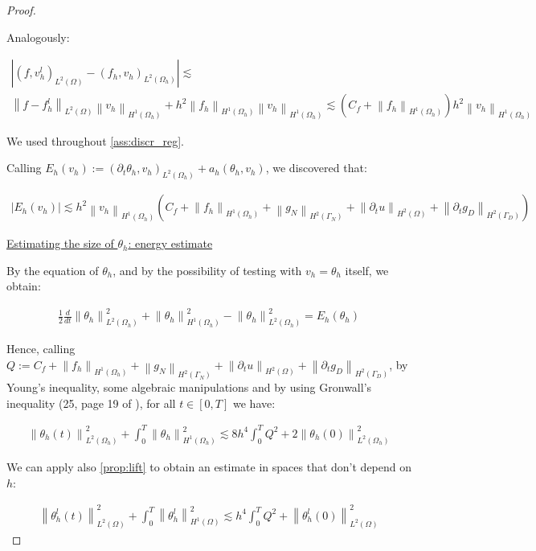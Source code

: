 \documentclass[english,a4paper,9pt,oneside]{scrbook}	%
\theoremstyle{break}
\newenvironment{mproof}[1][\proofname]{%
  \begin{proof}[#1]$ $\par\nobreak\ignorespaces
}{%
  \end{proof}
}
\renewcommand*{\proofname}{Proof}
\theoremstyle{remark}
\newcommand{\norm}[1]{\left\lVert#1\right\rVert}
\begin{document}
\begin{appendices}
\begin{mproof}
Analogously:

\begin{align*}
	|(f, v_h^l)_{L^2(\Omega)} - (f_h, v_h)_{L^2(\Omega_h)}|\lesssim\\
	\norm{f-f_h^l}_{L^2(\Omega)}\norm{v_h}_{H^1(\Omega_h)} + h^2 \norm{f_h}_{H^1(\Omega_h)}\norm{v_h}_{H^1(\Omega_h)}\lesssim (C_f + \norm{f_h}_{H^1(\Omega_h)}) h^2 \norm{v_h}_{H^1(\Omega_h)}
\end{align*}

We used throughout \cref{ass:discr_reg}.

Calling $E_h(v_h):=(\partial_t \theta_h , v_h)_{L^2(\Omega_h)} + a_h(\theta_h, v_h)$, we discovered that:

\begin{align}
\label{eqn:theta_residual}
	|E_h(v_h)|\lesssim h^2 \norm{v_h}_{H^1(\Omega_h)} (C_f + \norm{f_h}_{H^1(\Omega_h)} + \norm{g_N}_{H^2(\Gamma_N)} + \norm{\partial_t u}_{H^2(\Omega)} + \norm{\partial_t g_D}_{H^2(\Gamma_D)} )
\end{align}

\underline{Estimating the size of $\theta_h$: energy estimate}

By the equation of $\theta_h$, and by the possibility of testing with $v_h = \theta_h$ itself, we obtain:

\begin{align*}
	\frac{1}{2} \frac{d}{dt} \norm{\theta_h}_{L^2(\Omega_h)}^2 + \norm{\theta_h}^2_{H^1(\Omega_h)} - \norm{\theta_h}^2_{L^2(\Omega_h)} = E_h(\theta_h)
\end{align*}

Hence, calling  $Q:=C_f + \norm{f_h}_{H^1(\Omega_h)} + \norm{g_N}_{H^2(\Gamma_N)} + \norm{\partial_t u}_{H^2(\Omega)} + \norm{\partial_t g_D}_{H^2(\Gamma_D)}$, by Young's inequality, some algebraic manipulations and by using Gronwall's inequality (25, page 19 of \cite{gilardi}), for all $t \in [0,T]$ we have:

\begin{align}
\label{eqn:theta_energy}
	\norm{\theta_h(t)}_{L^2(\Omega_h)}^2 + \int_0^T\norm{\theta_h}^2_{H^1(\Omega_h)} \lesssim 8h^4\int_0^T Q^2 + 2\norm{\theta_h(0)}_{L^2(\Omega_h)}^2
\end{align}

We can apply also \cref{prop:lift} to obtain an estimate in spaces that don't depend on $h$:


\begin{align*}
	\norm{\theta_h^l(t)}_{L^2(\Omega)}^2 + \int_0^T\norm{\theta_h^l}^2_{H^1(\Omega)} \lesssim h^4\int_0^T Q^2 + \norm{\theta_h^l(0)}_{L^2(\Omega)}^2
\end{align*}


\end{mproof}
\end{appendices}
\end{document}
